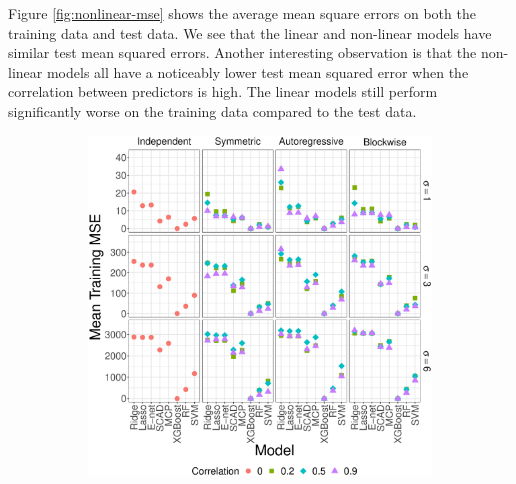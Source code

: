 \documentclass[final,onefignum,onetabnum]{siuro210301}
\begin{document}
	Figure \ref{fig:nonlinear-mse} shows the average mean square errors on both the training data and test data. We see that the linear and non-linear models have similar test mean squared errors. Another interesting observation is that the non-linear models all have a noticeably lower test mean squared error when the correlation between predictors is high. The linear models still perform significantly worse on the training data compared to the test data. 
	\begin{figure}[!htb]
		\centering
		\begin{subfigure}[b]{0.47\textwidth}
			\includegraphics[width=\textwidth]{images/facet/publication_facet_train_mse_nonlinear_50_2000.eps}
			\label{fig:nonlinear-test-mse}
		\end{subfigure}
		\hspace{6pt}
		\begin{subfigure}[b]{0.47\textwidth}

\end{subfigure}
\end{figure}
\end{document}
